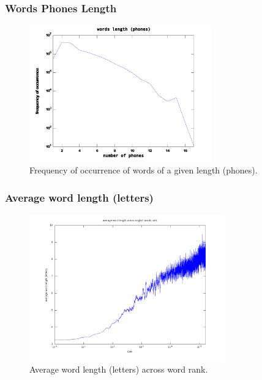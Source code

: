 \documentclass[notes]{beamer}
\begin{document}
\frame
{
  \frametitle{Words Phones Length}
\begin{figure}[h!]
\centering
\includegraphics[width=0.7\textwidth]{images/wordsphoneslength_en.pdf}
\caption{Frequency of occurrence of words of a given length (phones).}
\label{fig:wordsphoneslength_en}
\end{figure}   
}




\frame
{
  \frametitle{Average word length (letters)}
  \vspace{-0.2cm}
\begin{figure}[h!]
\centering
\includegraphics[width=0.75\textwidth]{images/averagewordslength_en.png}
\vspace{-0.2cm}
\caption{Average word length (letters) across word rank.}
\label{fig:averagewordslength_en}
\end{figure}   
}
\end{document}
